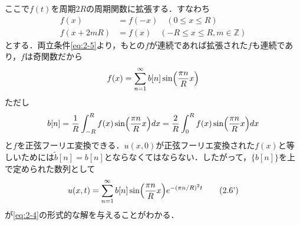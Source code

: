 \documentclass[dvipdfmx,a4j,10pt]{jsarticle}
\theoremstyle{mystyle1}
\theoremstyle{mystyle3}
\theoremstyle{mystyle4}
\theoremstyle{mystyle2}
\begin{document}
ここで$f(t)$を周期$2R$の周期関数に拡張する．すなわち
\[
    \begin{split}
        f(x)     & =f(-x)\quad(0\leq x\leq R)                 \\
        f(x+2mR) & =f(x)\quad (-R\leq x\leq R,m\in\mathbb{Z})
    \end{split}
\]
とする．両立条件\eqref{eq:2-5}より，もとの$f$が連続であれば拡張された$f$も連続であり，$f$は奇関数だから
\[
    f(x)=\sum_{n=1}^\infty b[n]\sin\mleft(\frac{\pi n}{R}x\mright)
\]
ただし
\[
    b[n]=\frac{1}{R}\int_{-R}^R f(x)\sin\mleft(\frac{\pi n}{R}x\mright) dx=\frac{2}{R}\int_0^R f(x)\sin\mleft(\frac{\pi n}{R}x\mright) dx
\]
と$f$を正弦フーリエ変換できる．$u(x,0)$が正弦フーリエ変換された$f(x)$と等しいためには$\tilde b[n]=b[n]$とならなくてはならない．したがって，$\{b[n]\}$を上で定められた数列として
\begin{equation}\label{eq:2-6'}
    u(x,t)=\sum_{n=1}^\infty b[n]\sin\mleft(\frac{\pi n}{R}x\mright)e^{-(\pi n/R)^2 t}\tag{2.6'}
\end{equation}
が\eqref{eq:2-4}の形式的な解を与えることがわかる．
\end{document}
